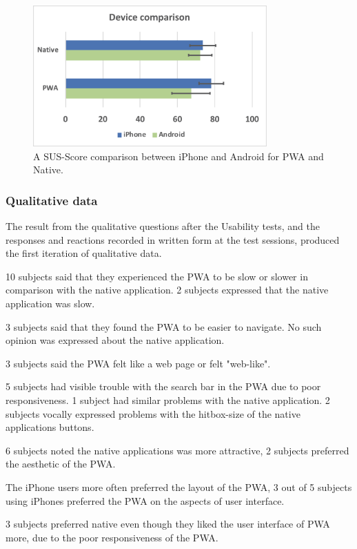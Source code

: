 \begin{figure}[ht]
    \centering 
    \includegraphics[width=0.8\textwidth]{img/SUS-Comparison.png}
    \hfill
    \caption{\label{fig:sus-comparison}{A SUS-Score comparison between iPhone and Android for PWA and Native.}}
\end{figure}

\subsubsection{Qualitative data}

The result from the qualitative questions after the Usability tests, and the responses and reactions recorded in written form at the test sessions, produced the first iteration of qualitative data.

10 subjects said that they experienced the PWA to be slow or slower in comparison with the native application. 2 subjects expressed that the native application was slow.

3 subjects said that they found the PWA to be easier to navigate. No such opinion was expressed about the native application.

3 subjects said the PWA felt like a web page or felt "web-like".

5 subjects had visible trouble with the search bar in the PWA due to poor responsiveness. 1 subject had similar problems with the native application. 2 subjects vocally expressed problems with the hitbox-size of the native applications buttons.

6 subjects noted the native applications was more attractive, 2 subjects preferred the aesthetic of the PWA.

The iPhone users more often preferred the layout of the PWA, 3 out of 5 subjects using iPhones preferred the PWA on the aspects of user interface.

3 subjects preferred native even though they liked the user interface of PWA more, due to the poor responsiveness of the PWA.


